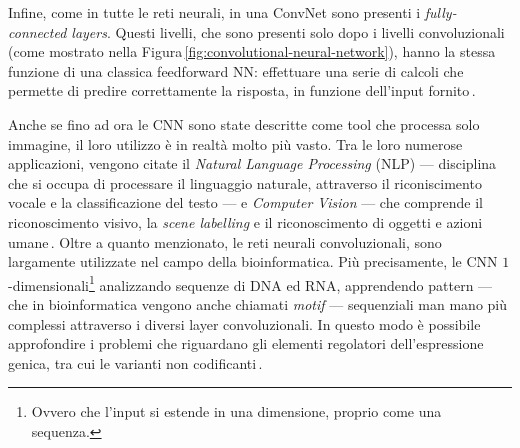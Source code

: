 Infine, come in tutte le reti neurali, in una \acs{ConvNet} sono presenti i \textit{fully-connected layers}. Questi livelli, che sono presenti solo dopo i livelli convoluzionali (come mostrato nella Figura\,\ref{fig:convolutional-neural-network}), hanno la stessa funzione di una classica feedforward \acs{NN}: effettuare una serie di calcoli che permette di predire correttamente la risposta, in funzione dell'input fornito\,\cite{aggarwal2018neural, o2015introduction}.

Anche se fino ad ora le \acs{CNN} sono state descritte come tool che processa solo immagine, il loro utilizzo è in realtà molto più vasto. Tra le loro numerose applicazioni, vengono citate il \textit{Natural Language Processing} (\acs{NLP}) — disciplina che si occupa di processare il linguaggio naturale, attraverso il riconiscimento vocale e la classificazione del testo — e \textit{Computer Vision} — che comprende il riconoscimento visivo, la \textit{scene labelling} e il riconoscimento di oggetti e azioni umane\,\cite{shamsaldin2019study, li2021survey, bhatt2021cnn}. Oltre a quanto menzionato, le reti neurali convoluzionali, sono largamente utilizzate nel campo della bioinformatica. Più precisamente, le \acs{CNN} $1$-dimensionali\footnote{Ovvero che l'input si estende in una dimensione, proprio come una sequenza.} analizzando sequenze di \acs{DNA} ed \acs{RNA}, apprendendo pattern — che in bioinformatica vengono anche chiamati \textit{motif} — sequenziali man mano più complessi attraverso i diversi layer convoluzionali. In questo modo è possibile approfondire i problemi che riguardano gli elementi regolatori dell'espressione genica, tra cui le varianti non codificanti\,\cite{min2017deep}.






\begin{comment}
    Per non diventare matti la notazione è l'opposta di quella sul file di Machine Learnign.
    - ci sono esattamente N feature in un vettore di input, di conseguenza il vettore di pesi è di lunghezza N
    - ci sono esattamente M vettori di input nel dataset, di conseguenza la lunghezza della label è M
    - Il dataset D è composta da j colonne ed i righe
    - Ciascuna riga j rappresenta un elemento del dataset
    - Ciascuna colonna i rappresente un feature del dataset
    
    Di conseguneza D_j indica il vettore j-esimo composto esattamente da N componenti. La label y_j indica il vero valore dell'input processato
\end{comment}

